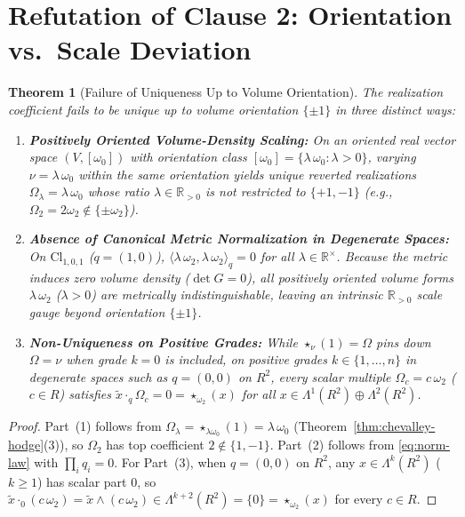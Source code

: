 \documentclass[11pt]{article}
\newtheorem{theorem}{Theorem}[section]
\theoremstyle{definition}
\newcommand{\Cl}{\mathrm{Cl}}
\begin{document}
\section{Refutation of Clause 2: Orientation vs.\ Scale Deviation}

\begin{theorem}[Failure of Uniqueness Up to Volume Orientation]\label{thm:uniqueness-fail}
The realization coefficient fails to be unique up to volume orientation $\{\pm 1\}$ in three distinct ways:
\begin{enumerate}
  \item[(1)] \textbf{Positively Oriented Volume-Density Scaling:} On an oriented real vector space $(V, [\omega_0])$ with orientation class $[\omega_0] = \{\lambda\,\omega_0 : \lambda > 0\}$, varying $\nu = \lambda\,\omega_0$ within the \emph{same} orientation yields unique reverted realizations $\Omega_\lambda = \lambda\,\omega_0$ whose ratio $\lambda \in \mathbb{R}_{>0}$ is not restricted to $\{+1, -1\}$ (e.g., $\Omega_2 = 2\omega_2 \notin \{\pm\omega_2\}$).
  \item[(2)] \textbf{Absence of Canonical Metric Normalization in Degenerate Spaces:} On $\Cl_{1,0,1}$ ($q = (1,0)$), $\langle \lambda\,\omega_2, \lambda\,\omega_2 \rangle_q = 0$ for \emph{all} $\lambda \in \mathbb{R}^\times$. Because the metric induces zero volume density ($\det G = 0$), all positively oriented volume forms $\lambda\,\omega_2$ ($\lambda > 0$) are metrically indistinguishable, leaving an intrinsic $\mathbb{R}_{>0}$ scale gauge beyond orientation $\{\pm 1\}$.
  \item[(3)] \textbf{Non-Uniqueness on Positive Grades:} While $\star_\nu(1) = \Omega$ pins down $\Omega = \nu$ when grade $k = 0$ is included, on positive grades $k \in \{1, \dots, n\}$ in degenerate spaces such as $q = (0,0)$ on $R^2$, every scalar multiple $\Omega_c = c\,\omega_2$ ($c \in R$) satisfies $\widetilde{x}\cdot_q \Omega_c = 0 = \star_{\omega_2}(x)$ for all $x \in \Lambda^1(R^2) \oplus \Lambda^2(R^2)$.
\end{enumerate}
\end{theorem}
\begin{proof}
Part~(1) follows from $\Omega_\lambda = \star_{\lambda\omega_0}(1) = \lambda\,\omega_0$ (Theorem~\ref{thm:chevalley-hodge}(3)), so $\Omega_2$ has top coefficient $2 \notin \{1,-1\}$. Part~(2) follows from \eqref{eq:norm-law} with $\prod_i q_i = 0$. For Part~(3), when $q=(0,0)$ on $R^2$, any $x \in \Lambda^k(R^2)$ ($k \ge 1$) has scalar part $0$, so $\widetilde{x}\cdot_0 (c\,\omega_2) = \widetilde{x}\wedge(c\,\omega_2) \in \Lambda^{k+2}(R^2) = \{0\} = \star_{\omega_2}(x)$ for every $c \in R$.
\end{proof}
\end{document}
